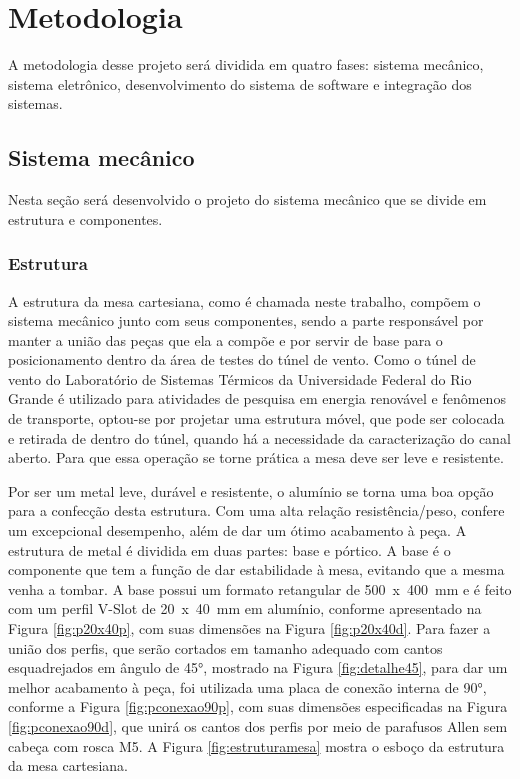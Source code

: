 \chapter{Metodologia}\label{ch:metodologia}

A metodologia desse projeto será dividida em quatro fases: sistema mecânico, sistema eletrônico, 
desenvolvimento do sistema de software e integração dos sistemas.

\section{Sistema mecânico}\label{sec:metmecanico}

Nesta seção será desenvolvido o projeto do sistema mecânico que se divide em estrutura e componentes. 

\subsection{Estrutura}\label{subsec:metestrutura}

A estrutura da mesa cartesiana, como é chamada neste trabalho, compõem o sistema mecânico junto com seus 
componentes, sendo a parte responsável por manter a união das peças que ela a compõe e por servir de base 
para o posicionamento dentro da área de testes do túnel de vento. Como o túnel de vento do Laboratório de 
Sistemas Térmicos da Universidade Federal do Rio Grande é utilizado para atividades de pesquisa em energia 
renovável e fenômenos de transporte, optou-se por projetar uma estrutura móvel, que pode ser colocada e 
retirada de dentro do túnel, quando há a necessidade da caracterização do canal aberto. Para que essa 
operação se torne prática a mesa deve ser leve e resistente.

Por ser um metal leve, durável e resistente, o alumínio se torna uma boa opção para a confecção desta 
estrutura. Com uma alta relação resistência/peso, confere um excepcional desempenho, além de dar um ótimo 
acabamento à peça. A estrutura de metal é dividida em duas partes: base e pórtico. A base é 
o componente que tem a função de dar estabilidade à mesa, evitando que a mesma venha a tombar. A base possui um 
formato retangular de 500~x~400~mm e é feito com um perfil V-Slot de 20~x~40~mm em alumínio, conforme 
apresentado na Figura \ref{fig:p20x40p}, com suas dimensões na Figura \ref{fig:p20x40d}. 
Para fazer a união dos perfis, que serão cortados em tamanho adequado com cantos esquadrejados em 
ângulo de 45°, mostrado na Figura \ref{fig:detalhe45}, para dar um melhor acabamento à peça, foi utilizada uma placa de conexão 
interna de 90°, conforme a Figura \ref{fig:pconexao90p}, com suas dimensões especificadas 
na Figura \ref{fig:pconexao90d}, que unirá os cantos dos perfis por 
meio de parafusos Allen sem cabeça com rosca M5. 
A Figura \ref{fig:estruturamesa} mostra o esboço da estrutura da mesa cartesiana.
    
